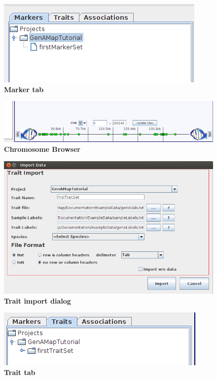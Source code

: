 \documentclass{article}
\begin{document}
\begin{figure}
\includegraphics[width=\textwidth]{markerTabExample.png}
\caption{\textbf{Marker tab}}
\label{markerTab}
\end{figure}


\begin{figure}
\includegraphics[width=\textwidth]{chromBrowser.png}
\caption{\textbf{Chromosome Browser}}
\label{chromBrowser}
\end{figure}


\begin{figure}
\includegraphics[width=\textwidth]{traitImport.png}
\caption{\textbf{Trait import dialog}}
\label{traitImport}
\end{figure}

\begin{figure}
\includegraphics[width=\textwidth]{traitTabExample.png}
\caption{\textbf{Trait tab}}
\label{traitTab}
\end{figure}
\end{document}
